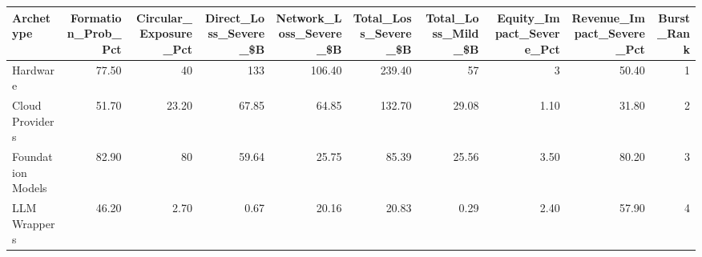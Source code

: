 

\begin{tabular}{@{}lrrrrrrrrr@{}}
\toprule
Archetype & Formation\_Prob\_Pct & Circular\_Exposure\_Pct & Direct\_Loss\_Severe\_\$B & Network\_Loss\_Severe\_\$B & Total\_Loss\_Severe\_\$B & Total\_Loss\_Mild\_\$B & Equity\_Impact\_Severe\_Pct & Revenue\_Impact\_Severe\_Pct & Burst\_Rank \\
\midrule
Hardware & 77.50 & 40 & 133 & 106.40 & 239.40 & 57 & 3 & 50.40 & 1 \\
Cloud Providers & 51.70 & 23.20 & 67.85 & 64.85 & 132.70 & 29.08 & 1.10 & 31.80 & 2 \\
Foundation Models & 82.90 & 80 & 59.64 & 25.75 & 85.39 & 25.56 & 3.50 & 80.20 & 3 \\
LLM Wrappers & 46.20 & 2.70 & 0.67 & 20.16 & 20.83 & 0.29 & 2.40 & 57.90 & 4 \\
\bottomrule
\end{tabular}